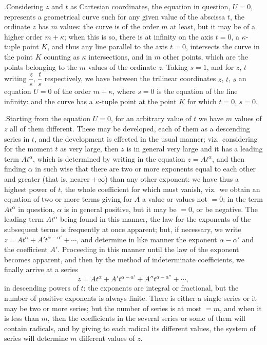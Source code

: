 \documentclass[11pt]{article}
\begin{document}
\medskip

.\quad Considering $z$ and $t$ as Cartesian coordinates, the equation in question, $U = 0$, represents a geometrical curve such for any given value of the abscissa $t$, the ordinate $z$ has $m$ values: the curve is of the order $m$ at least, but it may be of a higher order $m + \kappa$; when this is so, there is at infinity on the axis $t = 0$, a $\kappa$-tuple point $K$, and thus any line parallel to the axis $t = 0$, intersects the curve in the point $K$ counting as $\kappa$ intersections, and in $m$ other points, which are the points belonging to the $m$ values of the ordinate $z$. Taking $s = 1$, and for $z$, $t$ writing $\dfrac{z}{s}$, $\dfrac{t}{s}$ respectively, we have between the trilinear coordinates $z$, $t$, $s$ an equation $U = 0$ of the order $m + \kappa$, where $s = 0$ is the equation of the line infinity: and the curve has a $\kappa$-tuple point at the point $K$ for which $t = 0$, $s = 0$.

\medskip

.\quad Starting from the equation $U = 0$, for an arbitrary value of $t$ we have $m$ values of $z$ all of them different. These may be developed, each of them as a descending series in $t$, and the development is effected in the usual manner; viz.\ considering for the moment $t$ as very large, then $z$ is in general very large and it has a leading term $At^{\alpha}$, which is determined by writing in the equation $z = At^{\alpha}$, and then finding $\alpha$ in such wise that there are two or more exponents equal to each other and greater (that is, nearer $+\infty$) than any other exponent: we have thus a highest power of $t$, the whole coefficient for which must vanish, viz.\ we obtain an equation of two or more terms giving for $A$ a value or values not $=0$; in the term $At^{\alpha}$ in question, $\alpha$ is in general positive, but it may be $=0$, or be negative. The leading term $At^{\alpha}$ being found in this manner, the law for the exponents of the subsequent terms is frequently at once apparent; but, if necessary, we write $z = At^{\alpha} + A't^{\alpha-\alpha'} + \cdots$, and determine in like manner the exponent $\alpha - \alpha'$ and the coefficient $A'$. Proceeding in this manner until the law of the exponent becomes apparent, and then by the method of indeterminate coefficients, we finally arrive at a series
\[
z = At^{\alpha} + A't^{\alpha-\alpha'} + A''t^{\alpha-\alpha''} + \cdots,
\]
in descending powers of $t$: the exponents are integral or fractional, but the number of positive exponents is always finite. There is either a single series or it may be two or more series; but the number of series is at most $= m$, and when it is less than $m$, then the coefficients in the several series or some of them will contain radicals, and by giving to each radical its different values, the system of series will determine $m$ different values of $z$.
\end{document}
